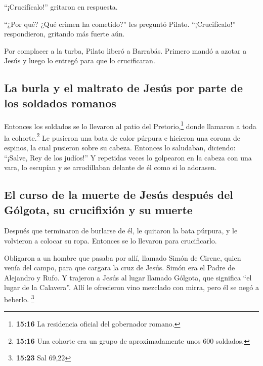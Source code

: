  ``¡Crucifícalo!'' gritaron en respuesta.

 ``¿Por qué? ¿Qué crimen ha cometido?'' les preguntó
Pilato. ``¡Crucifícalo!'' respondieron, gritando más fuerte aún.

 Por complacer a la turba, Pilato liberó a Barrabás.
Primero mandó a azotar a Jesús y luego lo entregó para que lo
crucificaran.

\hypertarget{la-burla-y-el-maltrato-de-jesuxfas-por-parte-de-los-soldados-romanos}{%
\subsection{La burla y el maltrato de Jesús por parte de los soldados
romanos}\label{la-burla-y-el-maltrato-de-jesuxfas-por-parte-de-los-soldados-romanos}}

 Entonces los soldados se lo llevaron al patio del
Pretorio,\footnote{\textbf{15:16} La residencia oficial del gobernador
  romano.} donde llamaron a toda la cohorte.\footnote{\textbf{15:16} Una
  cohorte era un grupo de aproximadamente unos 600 soldados.}
 Le pusieron una bata de color púrpura e hicieron una
corona de espinos, la cual pusieron sobre su cabeza. 
Entonces lo saludaban, diciendo: ``¡Salve, Rey de los judíos!''
 Y repetidas veces lo golpearon en la cabeza con una
vara, lo escupían y se arrodillaban delante de él como si lo adorasen.

\hypertarget{el-curso-de-la-muerte-de-jesuxfas-despuuxe9s-del-guxf3lgota-su-crucifixiuxf3n-y-su-muerte}{%
\subsection{El curso de la muerte de Jesús después del Gólgota, su
crucifixión y su
muerte}\label{el-curso-de-la-muerte-de-jesuxfas-despuuxe9s-del-guxf3lgota-su-crucifixiuxf3n-y-su-muerte}}

 Después que terminaron de burlarse de él, le quitaron la
bata púrpura, y le volvieron a colocar su ropa. Entonces se lo llevaron
para crucificarlo.

 Obligaron a un hombre que pasaba por allí, llamado Simón
de Cirene, quien venía del campo, para que cargara la cruz de Jesús.
Simón era el Padre de Alejandro y Rufo.  Y trajeron a
Jesús al lugar llamado Gólgota, que significa ``el lugar de la
Calavera''.  Allí le ofrecieron vino mezclado con mirra,
pero él se negó a beberlo. \footnote{\textbf{15:23} Sal 69,22}

